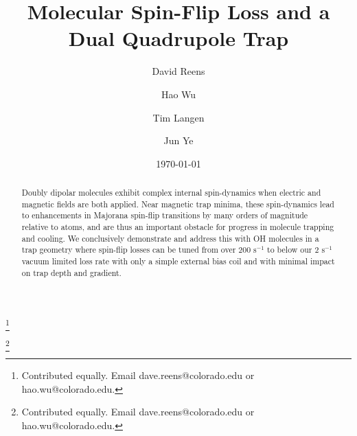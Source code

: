 \documentclass[%
 reprint,
 amsmath,amssymb,
 aps,
prl,
]{revtex4-1}
\begin{document}

\title{Molecular Spin-Flip Loss and a Dual Quadrupole Trap}%

\author{David Reens}
\thanks{Contributed equally. Email dave.reens@colorado.edu or hao.wu@colorado.edu.}

\author{Hao Wu}
\thanks{Contributed equally. Email dave.reens@colorado.edu or hao.wu@colorado.edu.}

\author{Tim Langen}%

\author{Jun Ye}


\date{\today}


\begin{abstract}
Doubly dipolar molecules exhibit complex internal spin-dynamics when electric and magnetic fields are both applied. 
Near magnetic trap minima, these spin-dynamics lead to enhancements in Majorana spin-flip transitions by many orders of magnitude relative to atoms, and are thus an important obstacle for progress in molecule trapping and cooling. 
We conclusively demonstrate and address this with OH molecules in a trap geometry where spin-flip losses can be tuned from over $200 \text{ s}^{-1} $ to below our $2\text{ s}^{-1}$ vacuum limited loss rate with only a simple external bias coil and with minimal impact on trap depth and gradient.
\end{abstract}


\maketitle


\end{document}
